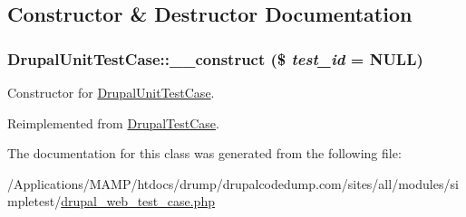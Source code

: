 \subsection{Constructor \& Destructor Documentation}
\hypertarget{class_drupal_unit_test_case_a90ea280099eab5b03f4584e04c2b38dc}{
\subsubsection[{\_\-\_\-construct}]{\setlength{\rightskip}{0pt plus 5cm}DrupalUnitTestCase::\_\-\_\-construct (\$ {\em test\_\-id} = {\ttfamily NULL})}}
\label{class_drupal_unit_test_case_a90ea280099eab5b03f4584e04c2b38dc}
Constructor for \hyperlink{class_drupal_unit_test_case}{DrupalUnitTestCase}. 

Reimplemented from \hyperlink{class_drupal_test_case_abb2516192da25b89bec5f5a4a7e91aab}{DrupalTestCase}.

The documentation for this class was generated from the following file:\begin{DoxyCompactItemize}
\item 
/Applications/MAMP/htdocs/drump/drupalcodedump.com/sites/all/modules/simpletest/\hyperlink{drupal__web__test__case_8php}{drupal\_\-web\_\-test\_\-case.php}\end{DoxyCompactItemize}
